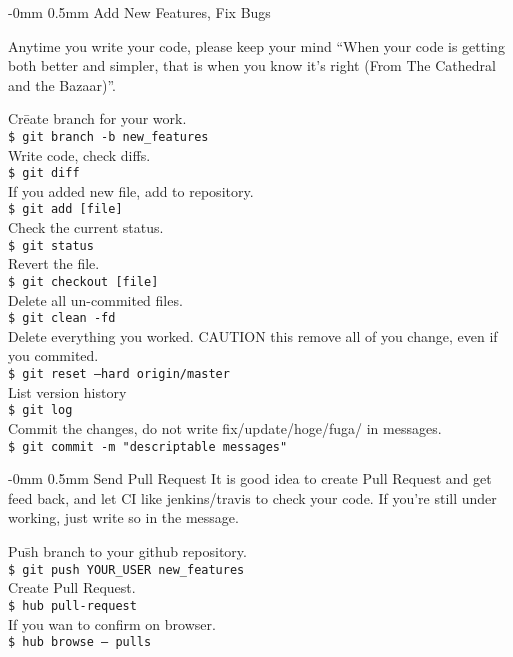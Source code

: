 \documentclass[10pt,landscape]{article}
\makeatletter
\renewcommand{\section}{\@startsection{section}{1}{0mm}%
                                {-0mm} %
                                {0.5mm}%
                                {\normalfont\large\bfseries}}
\makeatother
\begin{document}
\begin{multicols}{2}
\section{Add New Features, Fix Bugs}
\vspace{2.5mm}

Anytime you write your code, please keep your mind ``When your code is
getting both better and simpler, that is when you know it's
right (From The Cathedral and the Bazaar)''.

\begin{tabbing}
Cr\=eate branch for your work.\\
\> \texttt{\$ git branch -b new\_features}\\  
Write code, check diffs.\\
\> \texttt{\$ git diff}\\ 
If you added new file, add to repository.\\
\> \texttt{\$ git add [file]}\\ 
Check the current status.\\
\> \texttt{\$ git status}\\ 
Revert the file.\\
\> \texttt{\$ git checkout [file]}\\ 
Delete all un-commited files.\\
\> \texttt{\$ git clean -fd}\\ 
Delete everything you worked. CAUTION this remove all of
you change, even if you commited.\\
\> \texttt{\$ git reset --hard origin/master}\\ 
List version history\\
\> \texttt{\$ git log}\\ 
Commit the changes, do not write fix/update/hoge/fuga/ in messages.\\
\> \texttt{\$ git commit -m "descriptable messages"}
\end{tabbing}

\section{Send Pull Request}
\vspace{2.5mm}
It is good idea to create Pull Request and get
feed back, and let CI like jenkins/travis to check your code.
If you're still under working, just write so in the message.
\begin{tabbing}
Pu\=sh branch to your github repository.\\
\> \texttt{\$ git push YOUR\_USER new\_features}\\  
Create Pull Request.\\
\> \texttt{\$ hub pull-request}\\  
If you wan to confirm on browser.\\
\> \texttt{\$ hub browse -- pulls}\\  
\end{tabbing}


\end{multicols}
\end{document}
